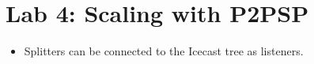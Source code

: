 \section*{Lab 4: Scaling with P2PSP}
\begin{center}
\end{center}
\begin{itemize}
  \item Splitters can be connected to the Icecast tree as listeners.
\end{itemize}



